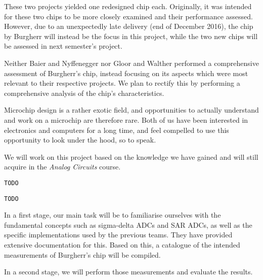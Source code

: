 \documentclass[a4paper,10pt]{article}
\begin{document}
\begin{description}[align=left]
        These two projects  yielded one redesigned chip  each.  Originally, it
        was intended for these two chips to be more closely examined and their
        performance assessed. However,  due to  an unexpectedly  late delivery
        (end of December 2016), the chip by Burgherr will instead be the focus
        in this  project, while  the two  new chips will  be assessed  in next
        semester's project.
    \item[Problem:]
        Neither  Baier  and Nyffenegger  nor  Gloor  and Walther  performed  a
        comprehensive assessment  of Burgherr's chip, instead  focusing on its
        aspects which were most relevant to their respective projects. We plan
        to rectify this  by performing a comprehensive analysis  of the chip's
        characteristics.
    \item[Personal Interest:]
        Microchip  design  is a  rather  exotic  field, and  opportunities  to
        actually understand and  work on a microchip  are therefore rare. Both
        of us  have been interested  in electronics  and computers for  a long
        time, and  feel compelled to  use this  opportunity to look  under the
        hood, so to speak.
    \item[Own theoretical position:]
        We will work on this project based on the knowledge we have gained and
        will still acquire in the \emph{Analog Circuits} course.
    \item[Question $\ne$ Task:] \texttt{TODO}
    \item[Objective:] \texttt{TODO}
    \item[Methodical Approach:]
        In a first stage, our main  task will be to familiarise ourselves with
        the fundamental  concepts such  as sigma-delta ADCs  and SAR  ADCs, as
        well as the specific implementations  used by the previous teams. They
        have  provided  extensive documentation  for  this. Based  on this,  a
        catalogue  of the  intended measurements  of Burgherr's  chip will  be
        compiled.

        In a second stage, we will perform those measurements and evaluate the
        results.


\end{description}
\end{document}
